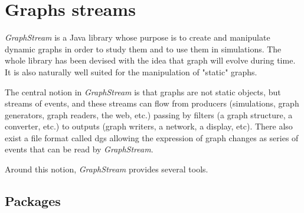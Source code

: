 \documentclass{svmult}
\begin{document}
\section{Graphs streams}


\emph{GraphStream} \cite{GraphStream} is a Java library whose purpose is to
create and manipulate dynamic graphs in order to study them and to use them in
simulations.  
The whole library has been devised with the idea that graph will evolve during
time. 
It is also naturally well suited for the manipulation of "static" graphs.

The central notion in \emph{GraphStream} is that graphs are not static
objects, but streams of events, and these streams can flow from producers
(simulations, graph generators, graph readers, the web, etc.) passing by
filters (a graph structure, a converter, etc.) to outputs (graph writers, a 
network, a display, etc). There also exist a file format called {\sc dgs}
allowing the expression of graph changes as series of events that can be read
by \emph{GraphStream}.      

Around this notion, \emph{GraphStream} provides several tools.

\subsection{Packages}
\end{document}
